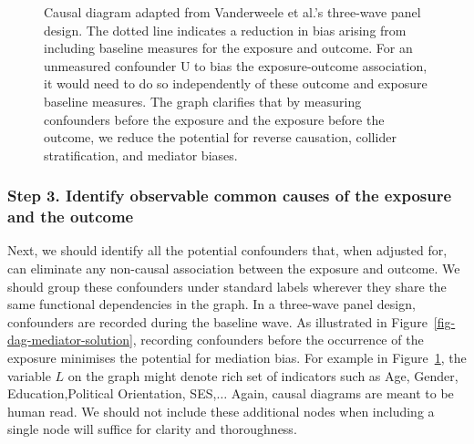 \documentclass[
  singlecolumn]{article}
\begin{document}
\begin{figure}


\caption{\label{fig-dag-6}Causal diagram adapted from Vanderweele et
al.'s three-wave panel design. The dotted line indicates a reduction in
bias arising from including baseline measures for the exposure and
outcome. For an unmeasured confounder U to bias the exposure-outcome
association, it would need to do so independently of these outcome and
exposure baseline measures. The graph clarifies that by measuring
confounders before the exposure and the exposure before the outcome, we
reduce the potential for reverse causation, collider stratification, and
mediator biases.}

\end{figure}%

\subsubsection{Step 3. Identify observable common causes of the exposure
and the
outcome}\label{step-3.-identify-observable-common-causes-of-the-exposure-and-the-outcome}

Next, we should identify all the potential confounders that, when
adjusted for, can eliminate any non-causal association between the
exposure and outcome. We should group these confounders under standard
labels wherever they share the same functional dependencies in the
graph. In a three-wave panel design, confounders are recorded during the
baseline wave. As illustrated in Figure~\ref{fig-dag-mediator-solution},
recording confounders before the occurrence of the exposure minimises
the potential for mediation bias. For example in Figure~\ref{fig-dag-6},
the variable \(L\) on the graph might denote rich set of indicators such
as Age, Gender, Education,Political Orientation, SES,\(\dots\) Again,
causal diagrams are meant to be human read. We should not include these
additional nodes when including a single node will suffice for clarity
and thoroughness.
\end{document}
